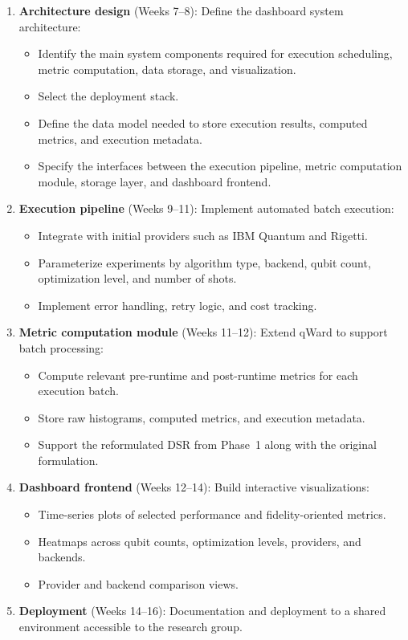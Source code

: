 \documentclass[11pt]{article}
\begin{document}
\begin{enumerate}
  \item \textbf{Architecture design} (Weeks 7--8): Define the dashboard system architecture:
  \begin{itemize}
    \item Identify the main system components required for execution scheduling, metric computation, data storage, and visualization.
    \item Select the deployment stack.
    \item Define the data model needed to store execution results, computed metrics, and execution metadata.
    \item Specify the interfaces between the execution pipeline, metric computation module, storage layer, and dashboard frontend.
  \end{itemize}

  \item \textbf{Execution pipeline} (Weeks 9--11): Implement automated batch execution:
  \begin{itemize}
    \item Integrate with initial providers such as IBM Quantum and Rigetti.
    \item Parameterize experiments by algorithm type, backend, qubit count, optimization level, and number of shots.
    \item Implement error handling, retry logic, and cost tracking.
  \end{itemize}

  \item \textbf{Metric computation module} (Weeks 11--12): Extend qWard to support batch processing:
  \begin{itemize}
    \item Compute relevant pre-runtime and post-runtime metrics for each execution batch.
    \item Store raw histograms, computed metrics, and execution metadata.
    \item Support the reformulated DSR from Phase~1 along with the original formulation.
  \end{itemize}

  \item \textbf{Dashboard frontend} (Weeks 12--14): Build interactive visualizations:
  \begin{itemize}
    \item Time-series plots of selected performance and fidelity-oriented metrics.
    \item Heatmaps across qubit counts, optimization levels, providers, and backends.
    \item Provider and backend comparison views.
  \end{itemize}

  \item \textbf{Deployment} (Weeks 14--16): Documentation and deployment to a shared environment accessible to the research group.
\end{enumerate}
\end{document}
